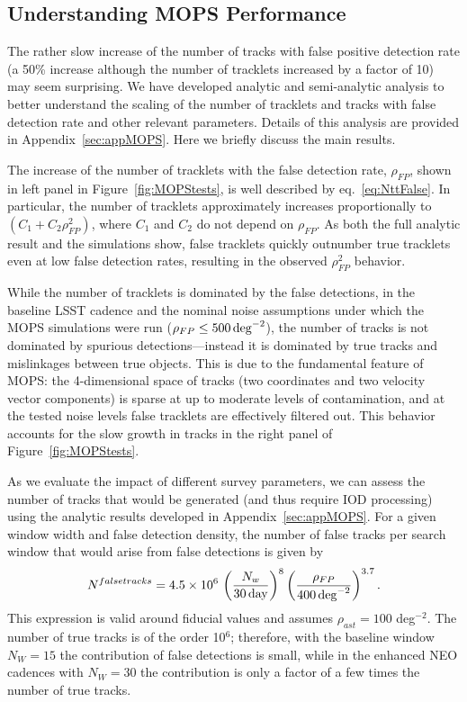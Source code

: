 \subsection{Understanding MOPS Performance}

The rather slow increase of the number of tracks with false positive detection rate (a 50\% increase
although the number of tracklets increased by a factor of 10) may seem surprising. We have
developed analytic and semi-analytic analysis to better understand the scaling of the number of
tracklets and tracks with false detection rate and other relevant parameters. Details of this
analysis are provided in Appendix~\ref{sec:appMOPS}. Here we briefly discuss the main results.

The increase of the number of tracklets with the false detection rate,
$\rho_{FP}$, shown in left panel in Figure~\ref{fig:MOPStests}, is well
described by eq.~\ref{eq:NttFalse}. In particular, the number of tracklets
approximately increases proportionally to $(C_1 + C_2\rho_{FP}^2)$, where $C_1$
and $C_2$ do not depend on $\rho_{FP}$. As both the full analytic result and the
simulations show, false tracklets quickly outnumber true tracklets even at low
false detection rates, resulting in the observed $\rho_{FP}^2$ behavior.

While the number of tracklets is dominated by the false detections, in the
baseline LSST cadence and the nominal noise assumptions under which the MOPS
simulations were run ($\rho_{FP} \leq 500\,\rm{deg}^{-2}$), the number of
tracks is not dominated by spurious detections---instead it is dominated by true
tracks and mislinkages between true objects. This is due to the fundamental
feature of MOPS: the 4-dimensional space of tracks (two coordinates and two
velocity vector components) is sparse at up to moderate levels of contamination,
and at the tested noise levels false tracklets are effectively filtered out. This
behavior accounts for the slow growth in tracks in the right panel of
Figure~\ref{fig:MOPStests}.

As we evaluate the impact of different survey parameters, we can assess the
number of tracks that would be generated (and thus require IOD processing) using
the analytic results developed in Appendix~\ref{sec:appMOPS}. For a given window
width and false detection density, the number of false tracks per search window
that would arise from false detections is given by
\begin{equation}
\label{eq:falsetracks2}
   N^{falsetracks} = 4.5 \times 10^6 \, \left( {N_w \over 30 \, {\rm day} } \right)^{8} \left( {\rho_{FP} \over 400 \, {\rm deg}^{-2} }\right)^{3.7}.
\end{equation}
This expression is valid around fiducial values and assumes $\rho_{ast}=100$ deg$^{-2}$.
The number of true tracks is of the order 10$^6$; therefore, with the baseline
window $N_W=15$ the contribution of false detections is small, while in the
enhanced NEO cadences with $N_W=30$ the contribution is only a factor of a few
times the number of true tracks.

